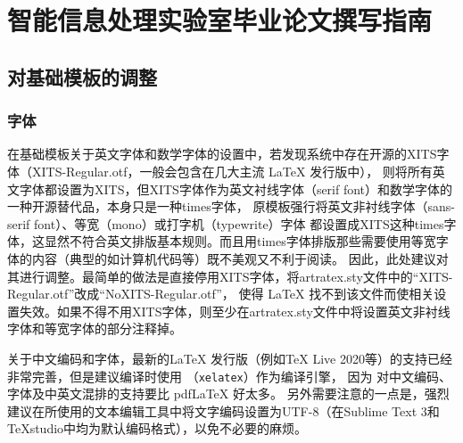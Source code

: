 
\newcommand*{\ltxcmdname}[1]{\texttt{\textbackslash #1}}
\newcommand*{\ltxenvname}[1]{\texttt{#1}}
\newcommand*{\dif}{\mathop{}\!\mathrm{d}}
\newcommand*{\tc}[1]{\multicolumn{1}{c|}{#1}} %

\newcommand*{\figref}[1]{图~\ref{#1}~}
\newcommand*{\secref}[1]{~\ref{#1}~节}
\newcommand*{\tabref}[1]{表~\ref{#1}~}
\newcommand*{\codref}[1]{程序~\ref{#1}~}
\newcommand*{\thmref}[1]{定理~\ref{#1}~}
\newcommand*{\axmref}[1]{公理~\ref{#1}~}
\newcommand*{\lemref}[1]{引理~\ref{#1}~}
\newcommand*{\prpref}[1]{命题~\ref{#1}~}
\newcommand*{\defref}[1]{定义~\ref{#1}~}

\newcommand*{\scite}[1]{~\cite{#1}~}
\newcommand*{\upcite}[1]{\textsuperscript{\cite{#1}}}

\chapter{智能信息处理实验室毕业论文撰写指南}

\section{对基础模板的调整}

\subsection{字体}
在基础模板关于英文字体和数学字体的设置中，若发现系统中存在开源的XITS字体（XITS-Regular.otf，一般会包含在几大主流 \LaTeX{} 发行版中），
则将所有英文字体都设置为XITS，但XITS字体作为英文衬线字体（serif font）和数学字体的一种开源替代品，本身只是一种times字体，
原模板强行将英文非衬线字体（sans-serif font）、等宽（mono）或打字机（typewrite）字体
都设置成XITS这种times字体，这显然不符合英文排版基本规则。而且用times字体排版那些需要使用等宽字体的内容（典型的如计算机代码等）既不美观又不利于阅读。
因此，此处建议对其进行调整。最简单的做法是直接停用XITS字体，将artratex.sty文件中的“XITS-Regular.otf”改成“NoXITS-Regular.otf”，
使得 \LaTeX{} 找不到该文件而使相关设置失效。如果不得不用XITS字体，则至少在artratex.sty文件中将设置英文非衬线字体和等宽字体的部分注释掉。

关于中文编码和字体，最新的\LaTeX{} 发行版（例如TeX Live 2020等）的支持已经非常完善，但是建议编译时使用 \XeLaTeX{} （\texttt{xelatex}）作为编译引擎，
因为 \XeLaTeX{} 对中文编码、字体及中英文混排的支持要比 pdfLaTeX 好太多。
另外需要注意的一点是，强烈建议在所使用的文本编辑工具中将文字编码设置为UTF-8（在Sublime Text 3和TeXstudio中均为默认编码格式），以免不必要的麻烦。

